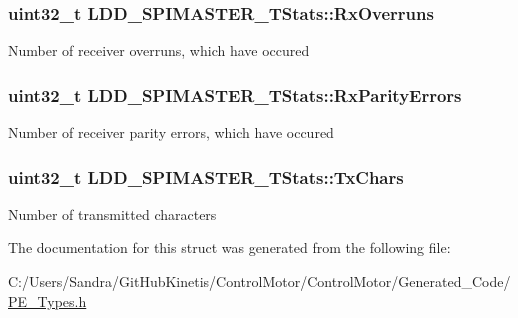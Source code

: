 \subsubsection[{\texorpdfstring{Rx\+Overruns}{RxOverruns}}]{\setlength{\rightskip}{0pt plus 5cm}uint32\+\_\+t L\+D\+D\+\_\+\+S\+P\+I\+M\+A\+S\+T\+E\+R\+\_\+\+T\+Stats\+::\+Rx\+Overruns}\hypertarget{struct_l_d_d___s_p_i_m_a_s_t_e_r___t_stats_a528cf1d78c49b42ae455ba895987ece5}{}\label{struct_l_d_d___s_p_i_m_a_s_t_e_r___t_stats_a528cf1d78c49b42ae455ba895987ece5}
Number of receiver overruns, which have occured 
\subsubsection[{\texorpdfstring{Rx\+Parity\+Errors}{RxParityErrors}}]{\setlength{\rightskip}{0pt plus 5cm}uint32\+\_\+t L\+D\+D\+\_\+\+S\+P\+I\+M\+A\+S\+T\+E\+R\+\_\+\+T\+Stats\+::\+Rx\+Parity\+Errors}\hypertarget{struct_l_d_d___s_p_i_m_a_s_t_e_r___t_stats_a83f9f4b7598e6d84e6842539cc54619f}{}\label{struct_l_d_d___s_p_i_m_a_s_t_e_r___t_stats_a83f9f4b7598e6d84e6842539cc54619f}
Number of receiver parity errors, which have occured 
\subsubsection[{\texorpdfstring{Tx\+Chars}{TxChars}}]{\setlength{\rightskip}{0pt plus 5cm}uint32\+\_\+t L\+D\+D\+\_\+\+S\+P\+I\+M\+A\+S\+T\+E\+R\+\_\+\+T\+Stats\+::\+Tx\+Chars}\hypertarget{struct_l_d_d___s_p_i_m_a_s_t_e_r___t_stats_af5376883e99d71f857999d58b2888f95}{}\label{struct_l_d_d___s_p_i_m_a_s_t_e_r___t_stats_af5376883e99d71f857999d58b2888f95}
Number of transmitted characters 

The documentation for this struct was generated from the following file\+:\begin{DoxyCompactItemize}
\item 
C\+:/\+Users/\+Sandra/\+Git\+Hub\+Kinetis/\+Control\+Motor/\+Control\+Motor/\+Generated\+\_\+\+Code/\hyperlink{_p_e___types_8h}{P\+E\+\_\+\+Types.\+h}\end{DoxyCompactItemize}
